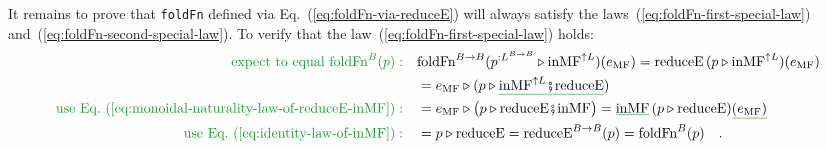 It remains to prove that \lstinline!foldFn! defined via Eq.~(\ref{eq:foldFn-via-reduceE})
will always satisfy the laws~(\ref{eq:foldFn-first-special-law})
and~(\ref{eq:foldFn-second-special-law}). To verify that the law~(\ref{eq:foldFn-first-special-law})
holds:
\begin{align*}
{\color{greenunder}\text{expect to equal }\text{foldFn}^{B}(p):}\quad & \text{foldFn}^{B\rightarrow B}(p^{:L^{B\rightarrow B}}\triangleright\text{inMF}^{\uparrow L})(e_{\text{MF}})=\text{reduceE}\,(p\triangleright\text{inMF}^{\uparrow L})(e_{\text{MF}})\\
 & =e_{\text{MF}}\triangleright(p\triangleright\gunderline{\text{inMF}^{\uparrow L}\bef\text{reduceE}})\\
{\color{greenunder}\text{use Eq.~(\ref{eq:monoidal-naturality-law-of-reduceE-inMF})}:}\quad & =e_{\text{MF}}\triangleright\big(p\triangleright\text{reduceE}\bef\text{inMF}\big)=\gunderline{\text{inMF}}\,(p\triangleright\text{reduceE})\gunderline{(e_{\text{MF}})}\\
{\color{greenunder}\text{use Eq.~(\ref{eq:identity-law-of-inMF})}:}\quad & =p\triangleright\text{reduceE}=\text{reduceE}^{B\rightarrow B}(p)=\text{foldFn}^{B}(p)\quad.
\end{align*}


